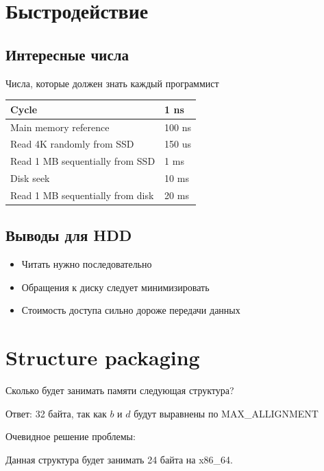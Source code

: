 \documentclass[../../lectures.tex]{subfiles}
\begin{document}
\section{Быстродействие}
\subsection{Интересные числа}
\begin{center}
Числа, которые должен знать каждый программист
\begin{tabular}{| l | l |}
    \hline
    Cycle                            & 1   ns \\ \hline
    Main memory reference            & 100 ns \\ \hline
    Read 4K randomly from SSD        & 150 us \\ \hline
    Read 1 MB sequentially from SSD  & 1   ms \\ \hline
    Disk seek                        & 10  ms \\ \hline
    Read 1 MB sequentially from disk & 20  ms \\ \hline
\end{tabular}
\end{center}
\subsection{Выводы для HDD}
\begin{itemize}
    \item Читать нужно последовательно
    \item Обращения к диску следует минимизировать
    \item Стоимость доступа сильно дороже передачи данных
\end{itemize}

\section{Structure packaging}
Сколько будет занимать памяти следующая структура?


Ответ: 32 байта, так как $b$ и $d$ будут выравнены по MAX\_ALLIGNMENT

Очевидное решение проблемы:


Данная структура будет занимать 24 байта на x86\_64.
\end{document}
